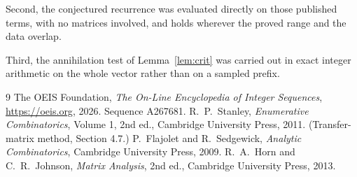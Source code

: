 \documentclass[11pt,a4paper]{article}
\theoremstyle{plain}
\theoremstyle{definition}
\begin{document}
Second, the conjectured recurrence was evaluated directly on those published terms, with no
matrices involved, and holds wherever the proved range and the data overlap.

Third, the annihilation test of Lemma~\ref{lem:crit} was carried out in exact integer
arithmetic on the whole vector rather than on a sampled prefix.

\begin{thebibliography}{9}
 The OEIS Foundation, \emph{The On-Line Encyclopedia of Integer
Sequences}, \url{https://oeis.org}, 2026. Sequence A267681.
 R.~P.~Stanley, \emph{Enumerative Combinatorics}, Volume 1, 2nd ed.,
Cambridge University Press, 2011. (Transfer-matrix method, Section 4.7.)
 P.~Flajolet and R.~Sedgewick, \emph{Analytic Combinatorics}, Cambridge
University Press, 2009.
 R.~A.~Horn and C.~R.~Johnson, \emph{Matrix Analysis}, 2nd ed., Cambridge
University Press, 2013.
\end{thebibliography}
\end{document}
